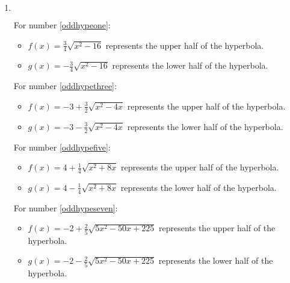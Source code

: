 \documentclass{ximera}
\begin{document}
\begin{enumerate}
\setcounter{enumi}{\value{HW}}

\item $~$


For number \ref{oddhypeone}:

\begin{itemize}

\item  $f(x) = \frac{3}{4} \sqrt{x^2-16}$ represents the upper half of the hyperbola.

\item  $g(x) =  -\frac{3}{4} \sqrt{x^2-16}$ represents the lower half of the hyperbola.

\end{itemize}

For number \ref{oddhypethree}:

\begin{itemize}

\item  $f(x) = -3 + \frac{3}{2} \sqrt{x^2-4x} $ represents the upper half of the hyperbola.

\item  $g(x) = -3 -  \frac{3}{2} \sqrt{x^2-4x} $ represents the lower half of the hyperbola.

\end{itemize}
For number \ref{oddhypefive}:

\begin{itemize}

\item  $f(x) = 4 + \frac{1}{4} \sqrt{x^2+8x} $ represents the upper half of the hyperbola.

\item  $g(x) = 4 - \frac{1}{4} \sqrt{x^2+8x}  $ represents the lower half of the hyperbola.

\end{itemize}


For number \ref{oddhypeseven}:

\begin{itemize}

\item  $f(x) = -2 + \frac{2}{5} \sqrt{5x^2-50x+225}$ represents the upper half of the hyperbola.

\item  $g(x) =-2 - \frac{2}{5} \sqrt{5x^2-50x+225}$ represents the lower half of the hyperbola.

\end{itemize}


\end{enumerate}
\end{document}
